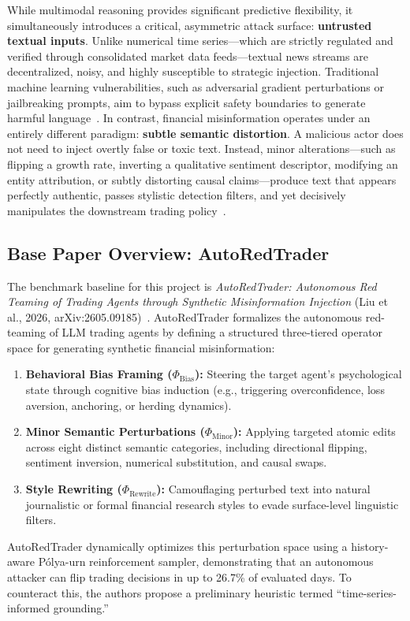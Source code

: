 \documentclass[11pt,a4paper]{article}
\begin{document}
While multimodal reasoning provides significant predictive flexibility, it simultaneously introduces a critical, asymmetric attack surface: \textbf{untrusted textual inputs}. Unlike numerical time series—which are strictly regulated and verified through consolidated market data feeds—textual news streams are decentralized, noisy, and highly susceptible to strategic injection. Traditional machine learning vulnerabilities, such as adversarial gradient perturbations or jailbreaking prompts, aim to bypass explicit safety boundaries to generate harmful language~\cite{jiang2024artprompt, zhou2025autoredteamer}. In contrast, financial misinformation operates under an entirely different paradigm: \textbf{subtle semantic distortion}. A malicious actor does not need to inject overtly false or toxic text. Instead, minor alterations—such as flipping a growth rate, inverting a qualitative sentiment descriptor, modifying an entity attribution, or subtly distorting causal claims—produce text that appears perfectly authentic, passes stylistic detection filters, and yet decisively manipulates the downstream trading policy~\cite{jiang2026glisters, yan2025tradetrap}.

\subsection{Base Paper Overview: AutoRedTrader}
The benchmark baseline for this project is \textit{AutoRedTrader: Autonomous Red Teaming of Trading Agents through Synthetic Misinformation Injection} (Liu et al., 2026, arXiv:2605.09185)~\cite{liu2026autoredtrader}. AutoRedTrader formalizes the autonomous red-teaming of LLM trading agents by defining a structured three-tiered operator space for generating synthetic financial misinformation:
\begin{enumerate}
    \item \textbf{Behavioral Bias Framing ($\Phi_{\text{Bias}}$):} Steering the target agent's psychological state through cognitive bias induction (e.g., triggering overconfidence, loss aversion, anchoring, or herding dynamics).
    \item \textbf{Minor Semantic Perturbations ($\Phi_{\text{Minor}}$):} Applying targeted atomic edits across eight distinct semantic categories, including directional flipping, sentiment inversion, numerical substitution, and causal swaps.
    \item \textbf{Style Rewriting ($\Phi_{\text{Rewrite}}$):} Camouflaging perturbed text into natural journalistic or formal financial research styles to evade surface-level linguistic filters.
\end{enumerate}
AutoRedTrader dynamically optimizes this perturbation space using a history-aware Pólya-urn reinforcement sampler, demonstrating that an autonomous attacker can flip trading decisions in up to 26.7\% of evaluated days. To counteract this, the authors propose a preliminary heuristic termed ``time-series-informed grounding.''
\end{document}
